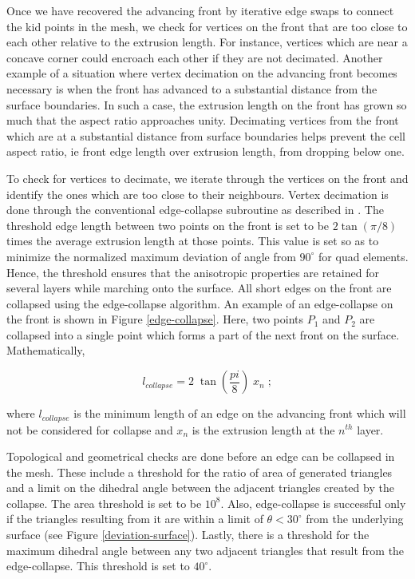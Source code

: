Once we have recovered the advancing front by iterative edge swaps to connect the kid points in the mesh, we check for vertices on the front that are too close to each other relative to the extrusion length. For instance, vertices which are near a concave corner could encroach each other if they are not decimated. Another example of a situation where vertex decimation on the advancing front becomes necessary is when the front has advanced to a substantial distance from the surface boundaries. In such a case, the extrusion length on the front has grown so much that the aspect ratio approaches unity. Decimating vertices from the front which are at a substantial distance from surface boundaries helps prevent the cell aspect ratio, ie front edge length over extrusion length, from dropping below one.

To check for vertices to decimate, we iterate through the vertices on the front and identify the ones which are too close to their neighbours. Vertex decimation is done through the conventional edge-collapse subroutine as described in \cite{hoppe1994mesh}. The threshold edge length between two points on the front is set to be $2 \tan(\pi/8)$ times the average extrusion length at those points. This value is set so as to minimize the normalized maximum deviation of angle from $90^\circ$ for quad elements. Hence, the threshold ensures that the anisotropic properties are retained for several layers while marching onto the surface. All short edges on the front are collapsed using the edge-collapse algorithm. An example of an edge-collapse on the front is shown in Figure \ref{edge-collapse}. Here, two points $P_1$ and $P_2$ are collapsed into a single point which forms a part of the next front on the surface. Mathematically,

\begin{equation}
l_{\mathit{collapse}} = 2 \; \tan \left( \frac{pi}{8} \right) \; x_n \; ;
\end{equation}

where $l_{\mathit{collapse}}$ is the minimum length of an edge on the advancing front which will not be considered for collapse and $x_n$ is the extrusion length at the $n^{th}$ layer.


Topological and geometrical checks are done before an edge can be collapsed in the mesh. These include a threshold for the ratio of area of generated triangles and a limit on the dihedral angle between the adjacent triangles created by the collapse. The area threshold is set to be $10^8$. Also, edge-collapse is successful only if the triangles resulting from it are  within a limit of $\theta < 30^{\circ}$ from the underlying surface (see Figure \ref{deviation-surface}). Lastly, there is a threshold for the maximum dihedral angle between any two adjacent triangles that result from the edge-collapse. This threshold is set to $40^{\circ}$. 

